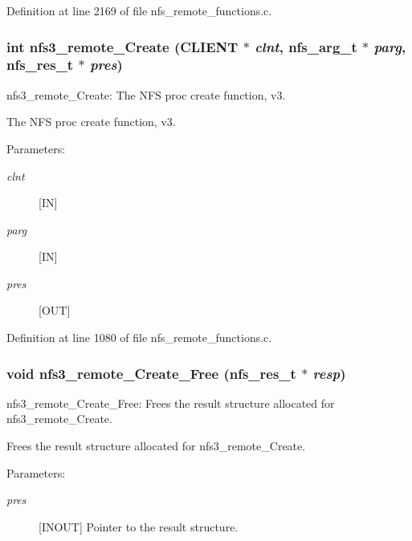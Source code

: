 Definition at line 2169 of file nfs\_\-remote\_\-functions.c.
\subsubsection[{nfs3\_\-remote\_\-Create}]{\setlength{\rightskip}{0pt plus 5cm}int nfs3\_\-remote\_\-Create (CLIENT $\ast$ {\em clnt}, \/  nfs\_\-arg\_\-t $\ast$ {\em parg}, \/  nfs\_\-res\_\-t $\ast$ {\em pres})}\label{group__NFSprocs_g0ecb4d67d86bb1787ddd38510b4f76a7}


nfs3\_\-remote\_\-Create: The NFS proc create function, v3.

The NFS proc create function, v3.

\begin{Desc}
\item[Parameters:]
\begin{description}
\item[{\em clnt}][IN] \item[{\em parg}][IN] \item[{\em pres}][OUT] \end{description}
\end{Desc}


Definition at line 1080 of file nfs\_\-remote\_\-functions.c.
\subsubsection[{nfs3\_\-remote\_\-Create\_\-Free}]{\setlength{\rightskip}{0pt plus 5cm}void nfs3\_\-remote\_\-Create\_\-Free (nfs\_\-res\_\-t $\ast$ {\em resp})}\label{group__NFSprocs_g74df3cbf4809a25911d3bd39be9366f4}


nfs3\_\-remote\_\-Create\_\-Free: Frees the result structure allocated for nfs3\_\-remote\_\-Create.

Frees the result structure allocated for nfs3\_\-remote\_\-Create.

\begin{Desc}
\item[Parameters:]
\begin{description}
\item[{\em pres}][INOUT] Pointer to the result structure. \end{description}
\end{Desc}


